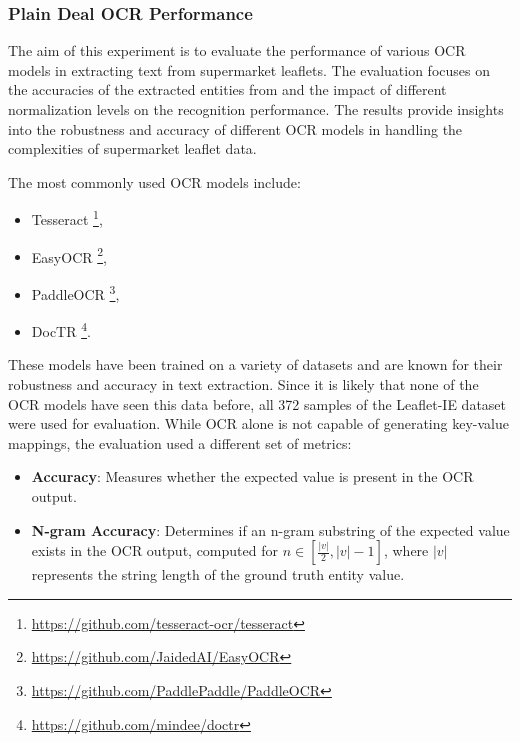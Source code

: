 \documentclass[11pt]{article}
\begin{document}
\subsubsection{Plain Deal OCR Performance}
The aim of this experiment is to evaluate the performance of various OCR models in extracting text from supermarket leaflets. The evaluation focuses on the accuracies of the extracted entities from  and the impact of different normalization levels on the recognition performance. The results provide insights into the robustness and accuracy of different OCR models in handling the complexities of supermarket leaflet data.

The most commonly used OCR models include:
\begin{itemize}
    \item Tesseract \footnote{\href{https://github.com/tesseract-ocr/tesseract}{https://github.com/tesseract-ocr/tesseract}},
    \item EasyOCR \footnote{\href{https://github.com/JaidedAI/EasyOCR}{https://github.com/JaidedAI/EasyOCR}},
    \item PaddleOCR \footnote{\href{https://github.com/PaddlePaddle/PaddleOCR}{https://github.com/PaddlePaddle/PaddleOCR}},
    \item DocTR \footnote{\href{https://github.com/mindee/doctr}{https://github.com/mindee/doctr}}.
\end{itemize}
These models have been trained on a variety of datasets and are known for their robustness and accuracy in text extraction. Since it is likely that none of the OCR models have seen this data before, all 372 samples of the Leaflet-IE dataset were used for evaluation. While OCR alone is not capable of generating key-value mappings, the evaluation used a different set of metrics:

\begin{itemize}
    \item \textbf{Accuracy}: Measures whether the expected value is present in the OCR output.
    \item \textbf{N-gram Accuracy}: Determines if an n-gram substring of the expected value exists in the OCR output, computed for $n \in \left[\frac{|v|}{2}, |v| - 1\right]$, where $|v|$ represents the string length of the ground truth entity value.
\end{itemize}
\end{document}
